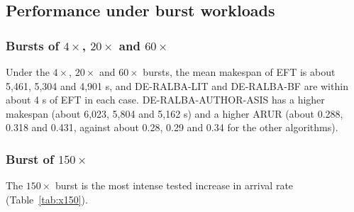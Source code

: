 \documentclass[default,sn-mathphys,Numbered]{sn-jnl}
\begin{document}
\subsection{Performance under burst workloads}
\subsubsection{Bursts of $4\times$, $20\times$ and $60\times$}
Under the $4\times$, $20\times$ and $60\times$ bursts, the mean makespan of EFT is about 5,461, 5,304 and 4,901 s, and DE-RALBA-LIT and DE-RALBA-BF are within about 4 s of EFT in each case. DE-RALBA-AUTHOR-ASIS has a higher makespan (about 6,023, 5,804 and 5,162 s) and a higher ARUR (about 0.288, 0.318 and 0.431, against about 0.28, 0.29 and 0.34 for the other algorithms).

\subsubsection{Burst of $150\times$}
The $150\times$ burst is the most intense tested increase in arrival rate (Table~\ref{tab:x150}).
\end{document}
